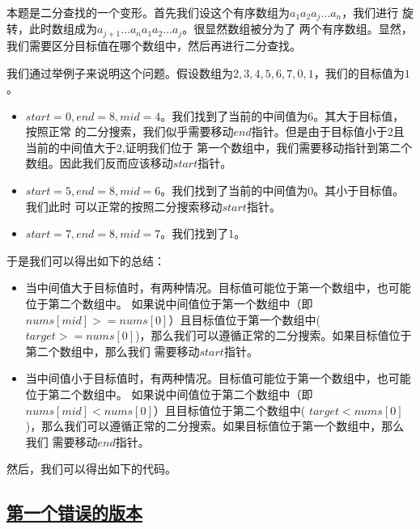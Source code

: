 \documentclass[../../main.tex]{subfiles}
\begin{document}
本题是二分查找的一个变形。首先我们设这个有序数组为$a_{1}a_{2}a_{j}\dots a_{n}$，我们进行
旋转，此时数组成为$a_{j + 1} \dots a_{n} a_{1}a_{2} \dots a_{j}$。很显然数组被分为了
两个有序数组。显然，我们需要区分目标值在哪个数组中，然后再进行二分查找。

我们通过举例子来说明这个问题。假设数组为$2,3,4,5,6,7,0,1$，我们的目标值为$1$。

\begin{itemize}
  \item $start = 0, end = 8, mid = 4$。我们找到了当前的中间值为6。其大于目标值，按照正常
  的二分搜索，我们似乎需要移动$end$指针。但是由于目标值小于2且当前的中间值大于2,证明我们位于
  第一个数组中，我们需要移动指针到第二个数组。因此我们反而应该移动$start$指针。
  \item $start = 5, end = 8, mid = 6$。我们找到了当前的中间值为0。其小于目标值。我们此时
  可以正常的按照二分搜索移动$start$指针。
  \item $start = 7, end = 8, mid = 7$。我们找到了1。
\end{itemize}

于是我们可以得出如下的总结：

\begin{itemize}
  \item 当中间值大于目标值时，有两种情况。目标值可能位于第一个数组中，也可能位于第二个数组中。
  如果说中间值位于第一个数组中（即$nums[mid] >= nums[0]$）且目标值位于第一个数组中(
  $target >= nums[0]$)，那么我们可以遵循正常的二分搜索。如果目标值位于第二个数组中，那么我们
  需要移动$start$指针。
  \item 当中间值小于目标值时，有两种情况。目标值可能位于第一个数组中，也可能位于第二个数组中。
  如果说中间值位于第二个数组中（即$nums[mid] < nums[0]$）且目标值位于第二个数组中(
  $target < nums[0]$)，那么我们可以遵循正常的二分搜索。如果目标值位于第一个数组中，那么我们
  需要移动$end$指针。
\end{itemize}

然后，我们可以得出如下的代码。



\subsection{\href{https://leetcode.cn/problems/first-bad-version/}{第一个错误的版本}}
\end{document}
